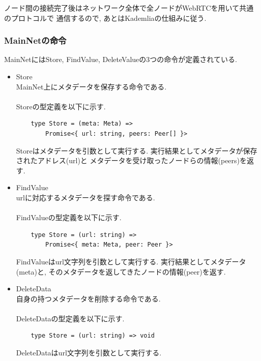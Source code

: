 \documentclass[sotsuron]{jcsie}
\begin{document}
ノード間の接続完了後はネットワーク全体で全ノードがWebRTCを用いて共通のプロトコルで
通信するので, あとはKademliaの仕組みに従う.

\subsubsection{MainNetの命令}
MainNetにはStore, FindValue, DeleteValueの3つの命令が定義されている.

\begin{itemize}
	\item {Store}\\
	      MainNet上にメタデータを保存する命令である.
	      \\\\
	      Storeの型定義を以下に示す.
	      \begin{lstlisting}
	type Store = (meta: Meta) => 
		Promise<{ url: string, peers: Peer[] }>
	      \end{lstlisting}
	      	      
	      Storeはメタデータを引数として実行する.
	      実行結果としてメタデータが保存されたアドレス(url)と
	      メタデータを受け取ったノードらの情報(peers)を返す.
	      \\
	\item {FindValue}\\
	      urlに対応するメタデータを探す命令である.
	      \\\\
	      FindValueの型定義を以下に示す.
	      \begin{lstlisting}
	type Store = (url: string) => 
		Promise<{ meta: Meta, peer: Peer }>
	      \end{lstlisting}
	      	      
	      FindValueはurl文字列を引数として実行する.
	      実行結果としてメタデータ(meta)と, 
	      そのメタデータを返してきたノードの情報(peer)を返す.
	      \\
	\item {DeleteData}\\
	      自身の持つメタデータを削除する命令である.
	      \\\\
	      DeleteDataの型定義を以下に示す.
	      \begin{lstlisting}
	type Store = (url: string) => void
	      \end{lstlisting}
	      	      
	      DeleteDataはurl文字列を引数として実行する.
\end{itemize}
\end{document}
